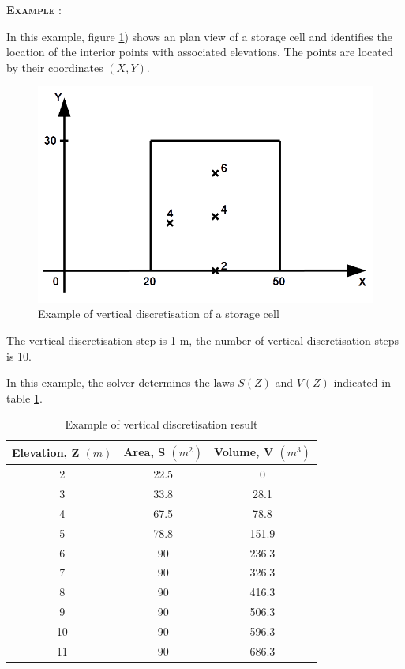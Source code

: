 \textsc{\textbf{Example}} :

In this example, figure \ref{fig:PlanimCasier}) shows an plan view of a storage cell and identifies the location of the interior points with associated elevations. The points are located by their coordinates $(X,Y)$.

\begin{figure}[H]
    \begin{center}
     \includegraphics[width=\textwidth]{Figures/PlanimCasier.png}
     \caption{Example of vertical discretisation of a storage cell}
     \label{fig:PlanimCasier}
    \end{center}
\end{figure}

The vertical discretisation step is 1 m, the number of vertical discretisation steps is 10.

In this example, the solver determines the laws $S(Z)$ and $V(Z)$ indicated in table \ref{ExPlan}.

\begin{table}
  \centering
  \caption{Example of vertical discretisation result}
  \label{ExPlan}
  \begin{tabular}{c|c|c}
  \textbf{Elevation, Z $(m)$} &\textbf{Area, S $(m^2)$} & \textbf{Volume, V $(m^3)$} \\
 \hline
  2 & 22.5 & 0 \\
  3 & 33.8 & 28.1 \\
  4 & 67.5 & 78.8 \\
  5 & 78.8 & 151.9 \\
  6 & 90 & 236.3 \\
  7 & 90 & 326.3 \\
  8 & 90 & 416.3 \\
  9 & 90 & 506.3 \\
 10 & 90 & 596.3 \\
 11 & 90 & 686.3 \\
  \hline
  \end{tabular}
\end{table}

